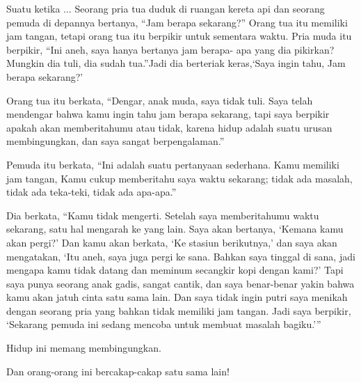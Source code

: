 Suatu ketika ... Seorang pria tua duduk di ruangan kereta api dan seorang pemuda di depannya bertanya, “Jam berapa sekarang?” Orang tua itu memiliki jam tangan, tetapi orang tua itu berpikir untuk sementara waktu. Pria muda itu berpikir, “Ini aneh, saya hanya bertanya jam berapa- apa yang dia pikirkan? Mungkin dia tuli, dia sudah tua.”Jadi dia berteriak keras,‘Saya ingin tahu, Jam berapa sekarang?’

Orang tua itu berkata, “Dengar, anak muda, saya tidak tuli. Saya telah mendengar bahwa kamu ingin tahu jam berapa sekarang, tapi saya berpikir apakah akan memberitahumu atau tidak, karena hidup adalah suatu urusan membingungkan, dan saya sangat berpengalaman.”

Pemuda itu berkata, “Ini adalah suatu pertanyaan sederhana. Kamu memiliki jam tangan, Kamu cukup memberitahu saya waktu sekarang; tidak ada masalah, tidak ada teka-teki, tidak ada apa-apa.”

Dia berkata, “Kamu tidak mengerti. Setelah saya memberitahumu waktu sekarang, satu hal mengarah ke yang lain. Saya akan bertanya, ‘Kemana kamu akan pergi?’ Dan kamu akan berkata, ‘Ke stasiun berikutnya,’ dan saya akan mengatakan, ‘Itu aneh, saya juga pergi ke sana. Bahkan saya tinggal di sana, jadi mengapa kamu tidak datang dan meminum secangkir kopi dengan kami?’ Tapi saya punya seorang anak gadis, sangat cantik, dan saya benar-benar yakin bahwa kamu akan jatuh cinta satu sama lain. Dan saya tidak ingin putri saya menikah dengan seorang pria yang bahkan tidak memiliki jam tangan. Jadi saya berpikir, ‘Sekarang pemuda ini sedang mencoba untuk membuat masalah bagiku.’”

Hidup ini memang membingungkan.

Dan orang-orang ini bercakap-cakap satu sama lain!




